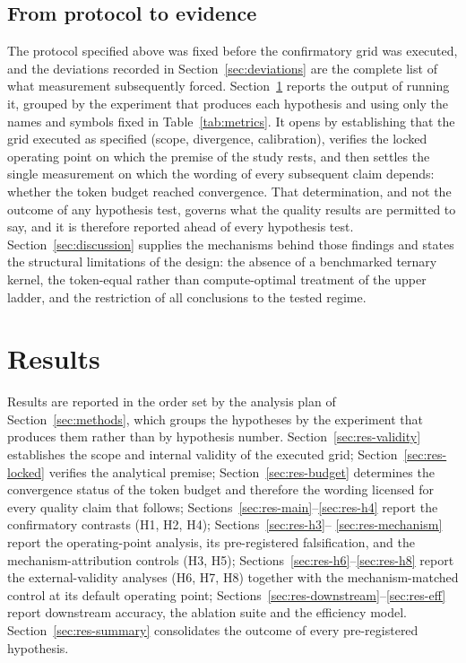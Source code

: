 \documentclass[final,5p,times,twocolumn]{elsarticle}
\theoremstyle{remark}
\begin{document}
\subsection{From protocol to evidence}
\label{sec:results-ref}
The protocol specified above was fixed before the confirmatory grid was
executed, and the deviations recorded in Section~\ref{sec:deviations} are the
complete list of what measurement subsequently forced.
Section~\ref{sec:results} reports the output of running it, grouped by the
experiment that produces each hypothesis and using only the names and symbols
fixed in Table~\ref{tab:metrics}. It opens by establishing that the grid executed as
specified (scope, divergence, calibration), verifies the locked operating
point on which the premise of the study rests, and then settles the single
measurement on which the wording of every subsequent claim depends: whether the
token budget reached convergence. That determination, and not the outcome of
any hypothesis test, governs what the quality results are permitted to say, and
it is therefore reported ahead of every hypothesis test. Section~\ref{sec:discussion}
supplies the mechanisms behind those findings and states the structural
limitations of the design: the absence of a benchmarked ternary kernel, the
token-equal rather than compute-optimal treatment of the upper ladder, and the
restriction of all conclusions to the tested regime.



\section{Results}
\label{sec:results}

Results are reported in the order set by the analysis plan of
Section~\ref{sec:methods}, which groups the hypotheses by the experiment that
produces them rather than by hypothesis number. Section~\ref{sec:res-validity} establishes the
scope and internal validity of the executed grid; Section~\ref{sec:res-locked}
verifies the analytical premise; Section~\ref{sec:res-budget} determines the
convergence status of the token budget and therefore the wording licensed for
every quality claim that follows; Sections~\ref{sec:res-main}--\ref{sec:res-h4}
report the confirmatory contrasts (H1, H2, H4); Sections~\ref{sec:res-h3}--%
\ref{sec:res-mechanism} report the operating-point analysis, its
pre-registered falsification, and the mechanism-attribution controls (H3, H5);
Sections~\ref{sec:res-h6}--\ref{sec:res-h8} report the external-validity
analyses (H6, H7, H8) together with the mechanism-matched control at its
default operating point; Sections~\ref{sec:res-downstream}--\ref{sec:res-eff}
report downstream accuracy, the ablation suite and the efficiency model.
Section~\ref{sec:res-summary} consolidates the outcome of every
pre-registered hypothesis.
\end{document}
